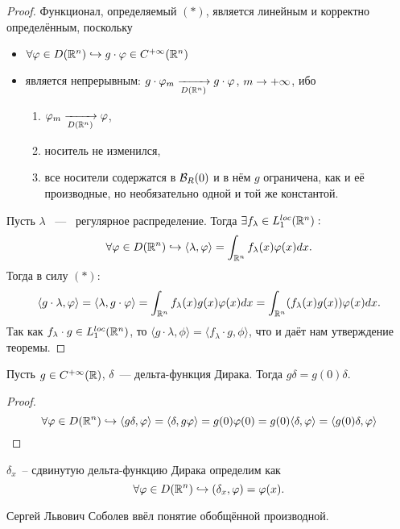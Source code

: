 \begin{proof} Функционал, определяемый $(\ast)$, является линейным и корректно определённым, поскольку
\begin{itemize}
    \item $\forall \varphi \in D(\mathbb{R}^n) \hookrightarrow g \cdot \varphi \in C^{+\infty}(\mathbb{R}^n)$
    \item является непрерывным: $g \cdot\varphi_m \xrightarrow[D(\mathbb{R}^n)]{} g \cdot \varphi$, $m \rightarrow +\infty$, ибо
    \begin{enumerate}
        \item $\varphi_m \xrightarrow[D(\mathbb{R}^n)]{} \varphi$,
        \item носитель не изменился,
        \item все носители содержатся в $\mathcal{B}_R(0)$ и в нём $g$ ограничена, как и её производные, но необязательно одной и той же константой.
    \end{enumerate}
\end{itemize}
Пусть $\lambda$ ~---~ регулярное распределение.
Тогда $\exists f_\lambda \in L_1^{loc}(\mathbb{R}^n):$
\[
    \forall \varphi \in D(\mathbb{R}^n) \hookrightarrow \langle \lambda, \varphi \rangle = \int_{\mathbb{R}^n} f_{\lambda}(x) \varphi(x) dx.
\]
Тогда в силу $(\ast)$:
\[
    \langle g \cdot \lambda, \varphi \rangle = \langle\lambda, g \cdot \varphi \rangle = \int_{\mathbb{R}^n} f_{\lambda}(x) g(x) \varphi(x) dx = \int_{\mathbb{R}^n} (f_\lambda(x) g(x))\varphi(x)dx.
\]
Так как $f_\lambda \cdot g \in L_1^{loc}(\mathbb{R}^n)$, то $\langle g \cdot \lambda, \phi \rangle  = \langle f_\lambda \cdot g, \phi \rangle $, что и даёт нам утверждение теоремы.
\end{proof}
\begin{example}
    Пусть $g \in C^{+\infty}(\mathbb{R})$, $\delta$~--- дельта-функция Дирака. Тогда $g\delta = g(0)\delta$.
    \begin{proof}
        \[ \forall \varphi \in D(\mathbb{R}^n) \hookrightarrow
        \langle g \delta, \varphi \rangle  = \langle \delta, g \varphi \rangle = g(0)\varphi(0) = g(0) \langle \delta, \varphi \rangle = \langle g(0)\delta, \varphi \rangle
        \]
    \end{proof}
\end{example}
\begin{definition}
    $\delta_x$~-- сдвинутую дельта-функцию Дирака определим как
    \[
        \forall \varphi \in D(\mathbb{R}^n) \hookrightarrow (\delta_x, \varphi) = \varphi(x).
    \]
\end{definition}
\begin{remark}
    Сергей Львович Соболев ввёл понятие обобщённой производной.
\end{remark}
